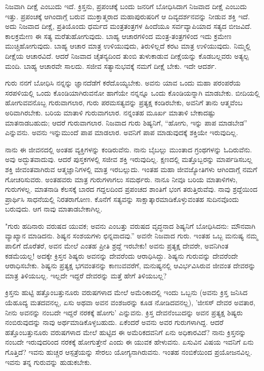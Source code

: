 ನಿಜವಾಗಿ ದೀಕ್ಷೆ ಎಂಬುದು ಇದೆ. ಕ್ರಿಸ್ತನು, ಪ್ರಪಂಚಕ್ಕೆ ಬಂದು ಜನರಿಗೆ ಬೋಧಿಸಿದಾಗ ನಿಜವಾದ ದೀಕ್ಷೆ ಎಂಬುದು ಇತ್ತು. ಪ್ರಪಂಚಕ್ಕೆ ಆಗಿಂದಾಗ್ಗೆ ಬರುವ ಮುಕ್ತಾತ್ಮರಾದ ಮಹಾಪುರುಷರಿಗೆ ಆ ದಿವ್ಯದರ್ಶನವನ್ನು ನೀಡುವ ಶಕ್ತಿ ಇದೆ. ಅದು ನಿಜವಾದ ದೀಕ್ಷೆ, ಪ್ರತಿಯೊಂದು ಧರ್ಮದ ಮಂತ್ರತಂತ್ರಗಳ ಹಿಂದೆಯೂ ಸರ್ವವ್ಯಾಪಿಯಾದ ಸತ್ಯದ ಬೀಜವಿದೆ. ಕಾಲಕ್ರಮೇಣ ಈ ಸತ್ಯ ಮರೆತುಹೋಗುವುದು. ಬಾಹ್ಯ ಆಚಾರಗಳಿಂದ ಮಂತ್ರ-ತಂತ್ರಗಳಿಂದ ಇದು ಕ್ರಮೇಣ ಮುಚ್ಚಿಹೋಗುವುದು. ಬಾಹ್ಯ ಆಚಾರ ಮಾತ್ರ ಉಳಿಯುವುದು, ತಿರುಳಿಲ್ಲದೆ ಕರಟ ಮಾತ್ರ ಉಳಿಯುವುದು. ನಿಮ್ಮಲ್ಲಿ ದೀಕ್ಷೆಯ ಆಚಾರವಿದೆ. ಆದರೆ ನಿಜವಾದ ಚೈತನ್ಯದಿಂದ ತುಂಬಿ ತುಳುಕಾಡುವ ದೀಕ್ಷೆಯನ್ನು ಕೊಡಬಲ್ಲವರು ಅತ್ಯಲ್ಪ ಮಂದಿ. ಬಾಹ್ಯ ಆಚಾರವೇ ಸಾಲದು. ಸಜೀವ ಸತ್ಯಾನುಭವಕ್ಕೆ ನಮಗೆ ದೀಕ್ಷೆ ಬೇಕು. ಇದೇ ಆದರ್ಶ.

ಗುರು ನನಗೆ ಬೋಧಿಸಿ ನನ್ನನ್ನು ಜ್ಞಾನದೆಡೆಗೆ ಕರೆದೊಯ್ಯಬೇಕು. ಅವನು ಯಾವ ಒಂದು ಮಹಾ ಪರಂಪರೆಯ ಸರಪಳಿಯಲ್ಲಿ ಒಂದು ಕೊಂಡಿಯಾಗಿರುವನೋ ಹಾಗೆಯೇ ನನ್ನನ್ನೂ ಒಂದು ಕೊಂಡಿಯನ್ನಾಗಿ ಮಾಡಬೇಕು. ಬೀದಿಯಲ್ಲಿ ಹೋಗುವವನೊಬ್ಬ ಗುರುವಾಗಲಾರ, ಗುರು ಪರಮಸತ್ಯವನ್ನು ಪ್ರತ್ಯಕ್ಷ ಕಂಡಿರಬೇಕು, ಅವನಿಗೆ ತಾನು ಆತ್ಮವೆಂಬ ಅರಿವಾಗಿರಬೇಕು. ಬರಿಯ ಮಾತಾಳಿ ಗುರುವಾಗಲಾರ. ನನ್ನಂತಹ ಮೂರ್ಖ ಮಾತಾಳಿ ಬೇಕಾದಷ್ಟು ಮಾತನಾಡಬಹುದು; ಆದರೆ ಗುರುವಾಗಲಾರ. ನಿಜವಾದ ಗುರು ಶಿಷ್ಯನಿಗೆ, “ಹೋಗು, ಇನ್ನು ಪಾಪ ಮಾಡಬೇಡ'' ಎನ್ನುವನು. ಅವನು ಇನ್ನುಮುಂದೆ ಪಾಪ ಮಾಡಲಾರ. ಅವನಿಗೆ ಪಾಪ ಮಾಡುವುದಕ್ಕೆ ಶಕ್ತಿಯೇ ಇರುವುದಿಲ್ಲ.

ನಾನು ಈ ಜೀವನದಲ್ಲಿ ಅಂತಹ ವ್ಯಕ್ತಿಗಳನ್ನು ಕಂಡಿರುವೆನು. ನಾನು ಬೈಬಲ್ಲು ಮುಂತಾದ ಗ್ರಂಥಗಳನ್ನು ಓದಿರುವೆನು. ಅವು ಅದ್ಭುತವಾದುವು. ಆದರೆ ಪುಸ್ತಕಗಳಲ್ಲಿ ಸಜೀವ ಶಕ್ತಿ ಇರುವುದಿಲ್ಲ. ಕ್ಷಣದಲ್ಲಿ ಮತ್ತೊಬ್ಬರನ್ನು ಮಾರ್ಪಡಿಸಬಲ್ಲ ಶಕ್ತಿ ಜೀವಂತವಾಗಿರುವ ಆತ್ಮಜ್ಞಾನಿಗಳಲ್ಲಿ ಮಾತ್ರ ಇರಬಲ್ಲುದು. ಇಂತಹ ಮಹಾ ಜೀವಜ್ಯೋತಿಗಳು ಆಗಿಂದಾಗ್ಗೆ ನಮಗೆ ಗೋಚರಿಸುವರು. ಅಂತಹವರು ಮಾತ್ರ ಗುರುಗಳಾಗಲು ಸಮರ್ಥರು. ನಾನೂ ನೀವೂ ಬರಿಯ ಮಾತಾಳಿಗಳು, ಗುರುಗಳಲ್ಲ. ಮಾತನಾಡಿ ಕೆಲಸಕ್ಕೆ ಬಾರದ ಗದ್ದಲದಿಂದ ಪ್ರಪಂಚದ ಶಾಂತಿಗೆ ಭಂಗ ತರುತ್ತಿರುವೆವು. ನಾವು ಶ್ರದ್ದೆಯಿಂದ ಪ್ರಾರ್ಥಿಸಿ ಸಾಧನೆಯಲ್ಲಿ ನಿರತರಾಗೋಣ. ಕೊನೆಗೆ ಸತ್ಯವನ್ನು ಸಾಕ್ಷಾತ್ಕಾರಮಾಡಿಕೊಳ್ಳುವಂತಹ ಸುದಿನವೊಂದು ಬರುವುದು. ಆಗ ನಾವು ಮಾತಾಡಬೇಕಾಗಿಲ್ಲ.

"ಗುರು ಹದಿನಾರು ವರುಷದ ಯುವಕ; ಅವನು ಎಂಬತ್ತು ವರುಷದ ವೃದ್ಧನಾದ ಶಿಷ್ಯನಿಗೆ ಬೋಧಿಸಿದನು: ಮೌನವಾಗಿ ವ್ಯಾಖ್ಯಾನ ಮಾಡಿದನು. ಶಿಷ್ಯನ ಸಂಶಯಗಳು ಛಿನ್ನವಾದವು.” ಅವನೇ ನಿಜವಾದ ಗುರು. ಇಂತಹ ಒಬ್ಬ ಮನುಷ್ಯ ನಮ್ಮ ಪಾಲಿಗೆ ದೊರೆತರೆ, ಅವನ ಮೇಲೆ ಎಂತಹ ಪ್ರೀತಿ ಶ್ರದ್ದೆ ಇರಬೇಕು! ಅವನು ಪ್ರತ್ಯಕ್ಷ ದೇವರೇ, ಅವನಿಗಿಂತ ಕಡಮೆಯಲ್ಲ! ಅದಕ್ಕೇ ಕ್ರಿಸ್ತನ ಶಿಷ್ಯರು ಅವನನ್ನು ದೇವರೆಂದು ಆರಾಧಿಸಿದ್ದು. ಶಿಷ್ಯನು ಗುರುವನ್ನು ದೇವರೆಂದೇ ಆರಾಧಿಸಬೇಕು. ಶಿಷ್ಯನು ಪ್ರತ್ಯಕ್ಷ ಭಗವಂತನನ್ನು ಕಾಣುವವರೆಗೆ, ಮನುಷ್ಯನಲ್ಲಿ ಆವಿರ್ಭವಿಸಿರುವ ಜೀವಂತ ದೇವರನ್ನು ಮಾತ್ರ ತಿಳಿಯಬಲ್ಲ. ಇಲ್ಲದೇ ಇದ್ದರೆ ದೇವರನ್ನು ಮತ್ತೆ ಹೇಗೆ ತಿಳಿಯಬಲ್ಲ?

ಕ್ರಿಸ್ತನು ಹುಟ್ಟಿ ಹತ್ತೊಂಬತ್ತುನೂರು ವರುಷಗಳಾದ ಮೇಲೆ ಅಮೆರಿಕಾದಲ್ಲಿ ಇಂದು ಒಬ್ಬನು (ಅವನು ಕ್ರಿಸ್ತ ಜನಿಸಿದ ಯೆಹೂದ್ಯ ಮತದವನಲ್ಲ, ಏಸು ಅಥವಾ ಅವನ ವಂಶಜರನ್ನು ಕೂಡ ನೋಡಿದವನಲ್ಲ), 'ಜೀಸಸ್ ದೇವರ ಅವತಾರ, ನೀನು ಅವನನ್ನು ನಂಬದೇ ಇದ್ದರೆ ನರಕಕ್ಕೆ ಹೋಗು' ಎನ್ನುವನು. ಕ್ರಿಸ್ತ ದೇವನೆಂಬುದನ್ನು ಅವನ ಪ್ರತ್ಯಕ್ಷ ಶಿಷ್ಯರು ನಂಬಿರುವುದನ್ನು ನಾವು ಅರ್ಥಮಾಡಿಕೊಳ್ಳಬಹುದು. ಏಕೆಂದರೆ ಅವನು ಅವರ ಗುರುಗಳಾಗಿದ್ದ. ಆದರೆ ಹತ್ತೊಂಬತ್ತುನೂರು ವರುಷಗಳಾದ ಮೇಲೆ ಹುಟ್ಟಿದ ಈ ಅಮೆರಿಕದವನಿಗೆ ಏನು ಅಧಿಕಾರವಿದೆ? ನಾನು ಕ್ರಿಸ್ತನನ್ನು ನಂಬದೇ ಇರುವುದರಿಂದ ನರಕಕ್ಕೆ ಹೋಗುತ್ತೇನೆ ಎಂದು ಈ ಯುವಕ ಹೇಳುವನು. ಏಸುವಿನ ವಿಷಯ ಇವನಿಗೆ ಏನು ಗೊತ್ತಿದೆ? ಇವನು ಹುಚ್ಚರ ಆಸ್ಪತ್ರೆಯನ್ನು ಸೇರಲು ಯೋಗ್ಯನಾಗಿರುವನು. ಇಂತಹ ನಂಬಿಕೆಯಿಂದ ಪ್ರಯೋಜನವಿಲ್ಲ. ಇವನು ತನ್ನ ಗುರುವನ್ನು ಹುಡುಕಬೇಕು.

